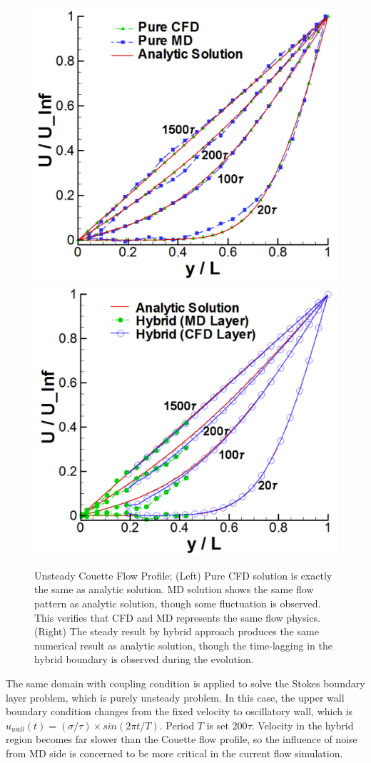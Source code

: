 \documentclass[conference,final]{IEEEtran}
\begin{document}
%
\begin{figure}[ht]
\centering
\includegraphics[width=0.7\linewidth]{Flat_Plate_Sol1_New.pdf}
\hskip 1cm
\includegraphics[width=0.7\linewidth]{Flat_Plate_Sol2_New.pdf}
\vskip-0.2cm
\caption{\small Unsteady Couette Flow Profile; (Left) Pure CFD solution is exactly the same as analytic solution. MD solution shows the same flow pattern as analytic solution, though some fluctuation is observed. This verifies that CFD and MD represents the same flow physics. (Right) The steady result by hybrid approach produces the same numerical result as analytic solution, though the time-lagging in the hybrid boundary is observed during the evolution.}
\label{Flat_Plate_Sol}
\end{figure}



The same domain with coupling condition is applied to solve the Stokes boundary layer problem, which is purely unsteady problem. In this case, the upper wall boundary condition changes from the fixed velocity to oscillatory wall, which is $u_{wall}(t)=({\sigma}/{\tau}){\times}sin(2{\pi}t/T)$. Period $T$ is set 200$\tau$. Velocity in the hybrid region becomes far slower than the Couette flow profile, so the influence of noise from MD side is concerned to be more critical in the current flow simulation.
\end{document}
